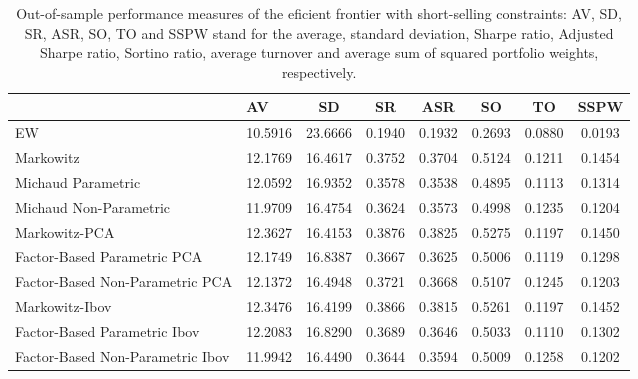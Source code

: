 \begin{table}

\caption{\label{tab:empirical_ef_2}Out-of-sample performance measures of the eficient frontier with short-selling constraints: AV, SD, SR, ASR, SO, TO and SSPW stand for the average, standard deviation, Sharpe ratio, Adjusted Sharpe ratio, Sortino ratio, average turnover and average sum of squared portfolio weights, respectively.}
\centering
\begin{tabular}[t]{l|l|c|c|c|c|c|c}
\hline
  & AV & SD & SR & ASR & SO & TO & SSPW\\
\hline
EW & 10.5916 & 23.6666 & 0.1940 & 0.1932 & 0.2693 & 0.0880 & 0.0193\\
\hline
Markowitz & 12.1769 & 16.4617 & 0.3752 & 0.3704 & 0.5124 & 0.1211 & 0.1454\\
\hline
Michaud Parametric & 12.0592 & 16.9352 & 0.3578 & 0.3538 & 0.4895 & 0.1113 & 0.1314\\
\hline
Michaud Non-Parametric & 11.9709 & 16.4754 & 0.3624 & 0.3573 & 0.4998 & 0.1235 & 0.1204\\
\hline
Markowitz-PCA & 12.3627 & 16.4153 & 0.3876 & 0.3825 & 0.5275 & 0.1197 & 0.1450\\
\hline
Factor-Based Parametric PCA & 12.1749 & 16.8387 & 0.3667 & 0.3625 & 0.5006 & 0.1119 & 0.1298\\
\hline
Factor-Based Non-Parametric PCA & 12.1372 & 16.4948 & 0.3721 & 0.3668 & 0.5107 & 0.1245 & 0.1203\\
\hline
Markowitz-Ibov & 12.3476 & 16.4199 & 0.3866 & 0.3815 & 0.5261 & 0.1197 & 0.1452\\
\hline
Factor-Based Parametric Ibov & 12.2083 & 16.8290 & 0.3689 & 0.3646 & 0.5033 & 0.1110 & 0.1302\\
\hline
Factor-Based Non-Parametric Ibov & 11.9942 & 16.4490 & 0.3644 & 0.3594 & 0.5009 & 0.1258 & 0.1202\\
\hline
\end{tabular}
\end{table}
